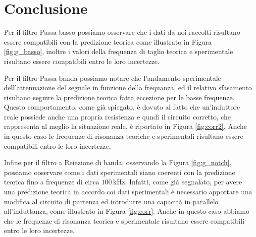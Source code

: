 \section*{Conclusione}

Per il filtro Passa-basso possiamo osservare che i dati da noi raccolti risultano essere compatibili con la predizione teorica come illustrato in Figura \ref{fig:g_basso}, inoltre i valori della frequenza di taglio teorica e sperimentale risultano essere compatibili entro le loro incertezze.

Per il filtro Passa-banda possiamo notare che l'andamento sperimentale dell'attenuazione del segnale in funzione della frequanza, ed il relativo sfasamento risultano seguire la predizione teorica fatta eccezione per le basse frequenze. Questo comportamento, come già spiegato, è dovuto al fatto che un'induttore reale possiede anche una propria resistenza e qundi il circuito corretto, che rappresenta al meglio la situazione reale, è riportato in Figura \ref{fig:corr2}. Anche in questo caso le frequenze di risonanza teoriche e sperimentali risultano essere compatibili entro le loro incertezze.

Infine per il filtro a Reiezione di banda, osservando la Figura \ref{fig:g_notch}, possiamo ooservare come i dati sperimentali siano coerenti con la predizione teorica fino a frequenze di circa $100\,\si{\kilo\hertz}$. Infatti, come già segnalato, per avere una predizione teorica in accordo coi dati sperimentali è necessario apportare una modifica al circuito di partenza ed introdurre una capacità in parallelo all'induttanza, come illustrato in Figura \ref{fig:corr}. Anche in questo caso abbiamo che le frequenze di risonanza teorica e sperimentale risultano essere compatibili entro le loro incertezze. 
